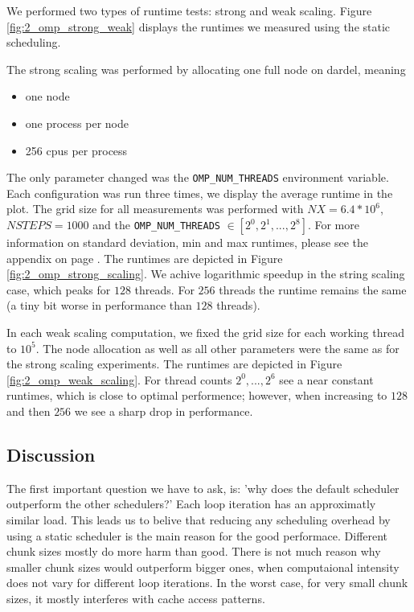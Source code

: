 \documentclass[a4paper,10pt]{article}
\begin{document}
We performed two types of runtime tests: strong and weak scaling.
Figure \ref{fig:2_omp_strong_weak} displays the runtimes we measured using the static scheduling.

The strong scaling was performed by allocating one full node on dardel, meaning
\begin{itemize}
\item one node
\item one process per node
\item 256 cpus per process
\end{itemize}
The only parameter changed was the \verb|OMP_NUM_THREADS| environment variable.
Each configuration was run three times, we display the average runtime in the plot.
The grid size for all measurements was performed with $NX = 6.4 * 10^6$, $NSTEPS = 1000$ and the \verb|OMP_NUM_THREADS| $\in [2^0, 2^1, ..., 2^8]$.
For more information on standard deviation, min and max runtimes, please see the appendix on page \pageref{sec:app:statistics}.
The runtimes are depicted in Figure \ref{fig:2_omp_strong_scaling}.
We achive logarithmic speedup in the string scaling case, which peaks for $128$ threads.
For $256$ threads the runtime remains the same (a tiny bit worse in performance than $128$ threads).

In each weak scaling computation, we fixed the grid size for each working thread to $10^5$.
The node allocation as well as all other parameters were the same as for the strong scaling experiments.
The runtimes are depicted in Figure \ref{fig:2_omp_weak_scaling}.
For thread counts $2^0, ..., 2^6$ see a near constant runtimes, which is close to optimal performence; however, when increasing to $128$ and then $256$ we see a sharp drop in performance.

\subsection{Discussion}
The first important question we have to ask, is: 'why does the default scheduler outperform the other schedulers?'
Each loop iteration has an approximatly similar load.
This leads us to belive that reducing any scheduling overhead by using a static scheduler is the main reason for the good performace.
Different chunk sizes mostly do more harm than good.
There is not much reason why smaller chunk sizes would outperform bigger ones, when computaional intensity does not vary for different loop iterations.
In the worst case, for very small chunk sizes, it mostly interferes with cache access patterns.
\end{document}

